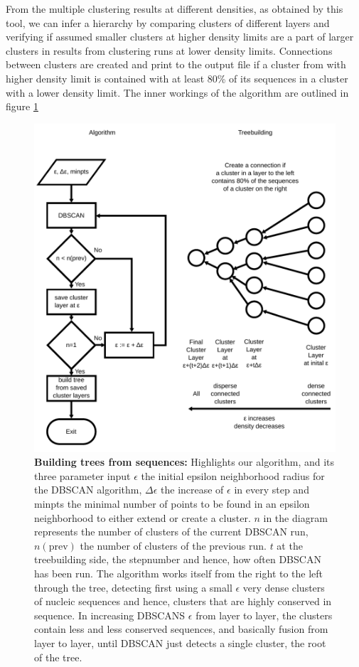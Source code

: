 From the multiple clustering results at different densities, as obtained
by this tool, we can infer a hierarchy by comparing clusters of
different layers and 
verifying if assumed smaller clusters at higher density limits
are a part of larger clusters in results from clustering runs at lower
density limits. Connections between clusters are created and print to the
output file if a cluster from with higher density limit is contained
with at least 80\% of its sequences in a cluster with a lower density
limit. The inner workings of the algorithm are outlined in figure
\ref{fig-adaptive-dbscan}
\begin{figure}
  \begin{center}
  \includegraphics[scale=0.8]{algorithm.pdf}
  \end{center}
  \caption{\textbf{Building trees from sequences:} Highlights our
    algorithm, and its three parameter input $\epsilon$ the initial
    epsilon neighborhood radius for the DBSCAN algorithm, $\Delta
    \epsilon$ the increase of $\epsilon$ in every step and minpts the
    minimal number of points to be found in an epsilon neighborhood to
    either extend or create a cluster. $n$ in the
    diagram represents the number of clusters of the current DBSCAN
    run, $n(\mathrm{prev})$ the number of clusters of the previous
    run. $t$ at the treebuilding side, the stepnumber and hence, how
    often DBSCAN has been run.
    The algorithm works itself from the right to the left through the
    tree, detecting first using a small $\epsilon$ very dense clusters
    of nucleic sequences and hence, clusters that are highly conserved
    in sequence. In increasing DBSCANS $\epsilon$ from layer to layer,
    the clusters contain less and less conserved sequences, and
    basically fusion from layer to layer, until DBSCAN just detects a
    single cluster, the root of the tree.}
  \label{fig-adaptive-dbscan}
\end{figure}
